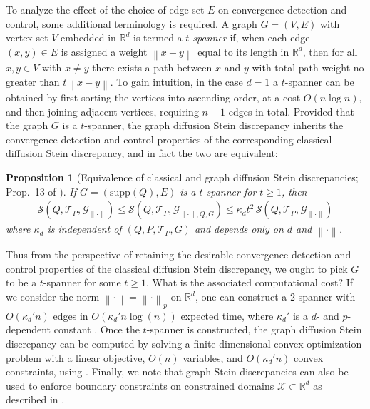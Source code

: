 \documentclass[12pt,paper=letter]{scrreprt}
\newtheorem{proposition}{Proposition}[chapter]
\def\reals{\mathbb{R}} %
\def\norm#1{\left\|{#1}\right\|} %
\def\supp#1{\mathrm{supp}({#1})}
\newcommand{\xset}[0]{\mathcal{X}} %
\begin{document}
To analyze the effect of the choice of edge set $E$ on convergence detection and control, some additional terminology is required.
A graph $G = (V,E)$ with vertex set $V$ embedded in $\mathbb{R}^d$ is termed a \emph{$t$-spanner} \citep{Chew86,peleg1989graph} if, when each edge $(x,y)\in E$ is assigned a weight $\norm{x-y}$ equal to its length in $\mathbb{R}^d$, then for all $x, y \in V$ with $x \neq y$ there exists a path between $x$ and $y$ with total path weight no greater than $t\norm{x-y}$.
To gain intuition, in the case $d=1$ a $t$-spanner can be obtained by first sorting the vertices into ascending order, at a cost $O(n \log n)$, and then joining adjacent vertices, requiring $n-1$ edges in total.
Provided that the graph $G$ is a $t$-spanner, the graph diffusion Stein discrepancy inherits the convergence detection and control properties of the corresponding classical diffusion Stein discrepancy, and in fact the two are equivalent:
\begin{proposition}[Equivalence of classical and graph diffusion Stein discrepancies; Prop.~13 of \citealp{Gorham2019}] \label{prop:spanner-equivalence}
If $G = (\supp{Q}, E)$ is a $t$-spanner for $t \geq 1$, then
\begin{align*}
\mathcal{S}(Q,\mathcal{T}_P,\mathcal{G}_{\|\cdot\|}) \leq \mathcal{S}(Q,\mathcal{T}_P,\mathcal{G}_{\|\cdot\|,Q,G}) \leq \kappa_d t^2\, \mathcal{S}(Q,\mathcal{T}_P,\mathcal{G}_{\|\cdot\|})
\end{align*}
where $\kappa_d$ is independent of $(Q,P,\mathcal{T}_P,G)$ and depends only on $d$ and $\norm{\cdot}$.
\end{proposition}

\noindent Thus from the perspective of retaining the desirable convergence detection and control properties of the classical diffusion Stein discrepancy, we ought to pick $G$ to be a $t$-spanner for some $t \geq 1$.
What is the associated computational cost?
If we consider the norm $\norm{\cdot} = \norm{\cdot}_p$ on $\mathbb{R}^d$, one can construct a $2$-spanner with $O(\kappa_d' n)$ edges in $O(\kappa_d' n\log(n))$ expected time, where $\kappa_d'$ is a $d$- and $p$-dependent constant \citep{har2005fast}.
Once the $t$-spanner is constructed, the graph diffusion Stein discrepancy can be computed by solving a finite-dimensional convex optimization problem with a linear objective, $O(n)$ variables, and $O(\kappa_d' n)$ convex constraints, using .
Finally, we note that graph Stein discrepancies can also be used to enforce boundary constraints on constrained domains $\xset\subset\reals^d$ as described in \citet[Sec.~4.4]{gorham2015measuring}.
\end{document}
